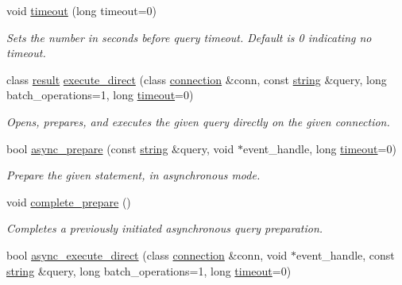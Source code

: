 \begin{DoxyCompactItemize}
void \mbox{\hyperlink{classnanodbc_1_1statement_adbd1acbbdcc529dc668bfef341593573}{timeout}} (long timeout=0)
\begin{DoxyCompactList}\small\item\em Sets the number in seconds before query timeout. Default is 0 indicating no timeout. \end{DoxyCompactList}\item 
class \mbox{\hyperlink{classnanodbc_1_1result}{result}} \mbox{\hyperlink{classnanodbc_1_1statement_af070dc29a840854e261bda5761318cf0}{execute\+\_\+direct}} (class \mbox{\hyperlink{classnanodbc_1_1connection}{connection}} \&conn, const \mbox{\hyperlink{namespacenanodbc_abfc0ece56278e590911ec8352774c212}{string}} \&query, long batch\+\_\+operations=1, long \mbox{\hyperlink{classnanodbc_1_1statement_adbd1acbbdcc529dc668bfef341593573}{timeout}}=0)
\begin{DoxyCompactList}\small\item\em Opens, prepares, and executes the given query directly on the given connection. \end{DoxyCompactList}\item 
bool \mbox{\hyperlink{classnanodbc_1_1statement_ab676933b9578da7d773f97269d270eee}{async\+\_\+prepare}} (const \mbox{\hyperlink{namespacenanodbc_abfc0ece56278e590911ec8352774c212}{string}} \&query, void $\ast$event\+\_\+handle, long \mbox{\hyperlink{classnanodbc_1_1statement_adbd1acbbdcc529dc668bfef341593573}{timeout}}=0)
\begin{DoxyCompactList}\small\item\em Prepare the given statement, in asynchronous mode. \end{DoxyCompactList}\item 
void \mbox{\hyperlink{classnanodbc_1_1statement_a416c39007e292cf9b95f368d829ad5cb}{complete\+\_\+prepare}} ()
\begin{DoxyCompactList}\small\item\em Completes a previously initiated asynchronous query preparation. \end{DoxyCompactList}\item 
bool \mbox{\hyperlink{classnanodbc_1_1statement_a34184874a281b654f685b2f351956302}{async\+\_\+execute\+\_\+direct}} (class \mbox{\hyperlink{classnanodbc_1_1connection}{connection}} \&conn, void $\ast$event\+\_\+handle, const \mbox{\hyperlink{namespacenanodbc_abfc0ece56278e590911ec8352774c212}{string}} \&query, long batch\+\_\+operations=1, long \mbox{\hyperlink{classnanodbc_1_1statement_adbd1acbbdcc529dc668bfef341593573}{timeout}}=0)

\end{DoxyCompactItemize}
